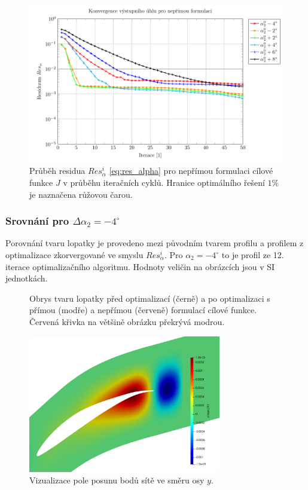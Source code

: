 \begin{figure}[H]
	\includegraphics[width=1.0\columnwidth]{img/FyA.pdf}
	\caption[Průběh residua $ Res_{\alpha}^i $, nepřímá formulace]{Průběh residua $ Res_{\alpha}^i $ \ref{eq:res_alpha} pro nepřímou formulaci cílové funkce $ J $ v průběhu iteračních cyklů. Hranice optimálního řešení $ 1\% $ je naznačena růžovou čarou.}
	\label{fig:ghs1_FyA}
\end{figure}
\newpage
\subsubsection{Srovnání pro $ \Delta \alpha_2=-4^{\circ} $}

Porovnání tvaru lopatky je provedeno mezi původním tvarem profilu a profilem z optimalizace zkorvergované ve smyslu $ Res_{\alpha}^i $. Pro $ \alpha_2=-4^\circ $ to je profil ze 12. iterace optimalizačního algoritmu. Hodnoty veličin na obrázcích jsou v SI jednotkách.

\begin{figure}[H]
	\centering
	\def\svgwidth{0.8\textwidth}
	\graphicspath{{img/inkscape/}}
	
	\caption[Tvar optimalizované lopatky]{Obrys tvaru lopatky před optimalizací (černě) a po optimalizaci s přímou (modře) a nepřímou (červeně) formulací cílové funkce. Červená křivka na většině obrázku překrývá modrou.}
	\label{fig:ghs1_alphaminus4}
\end{figure}

\begin{figure}[H]
\includegraphics[width=0.75\textwidth]{img/displacement_12.png}
\caption[Pole posunutí sítě]{Vizualizace pole posunu bodů sítě ve směru osy $ y $.}
\label{fig:ghs1_disp12}
\end{figure}

